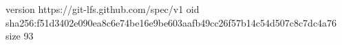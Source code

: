 version https://git-lfs.github.com/spec/v1
oid sha256:f51d3402e090ea8c6e74be16e9be603aafb49cc26f57b14c54d507c8c7dc4a76
size 93

